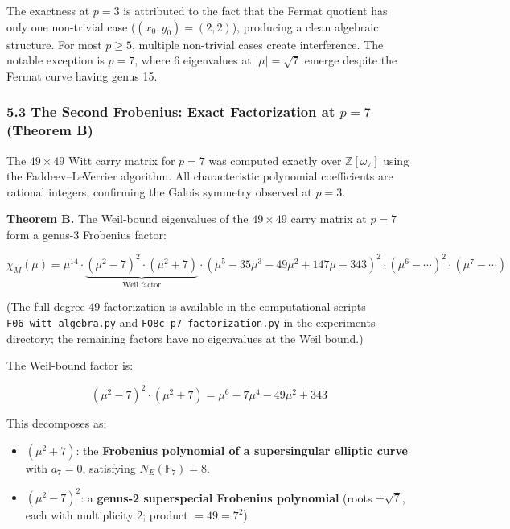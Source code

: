 \documentclass[
  11pt,
]{article}
\providecommand{\tightlist}{%
  \setlength{\itemsep}{0pt}\setlength{\parskip}{0pt}}
\begin{document}
The exactness at \(p = 3\) is attributed to the fact that the Fermat quotient
has only one non-trivial case (\((x_0, y_0) = (2,2)\)), producing a clean
algebraic structure. For most \(p \geq 5\), multiple non-trivial cases create
interference. The notable exception is \(p = 7\), where 6 eigenvalues at
\(\lvert\mu\rvert = \sqrt{7}\) emerge despite the Fermat curve having genus 15.

\subsubsection{\texorpdfstring{5.3 The Second Frobenius: Exact Factorization at
\(p = 7\) (Theorem
B)}{5.3 The Second Frobenius: Exact Factorization at p = 7 (Theorem B)}}\label{the-second-frobenius-exact-factorization-at-p-7-theorem-b}

The \(49 \times 49\) Witt carry matrix for \(p = 7\) was computed exactly over
\(\mathbb{Z}[\omega_7]\) using the Faddeev--LeVerrier algorithm. All
characteristic polynomial coefficients are rational integers, confirming the
Galois symmetry observed at \(p = 3\).

\textbf{Theorem B.} The Weil-bound eigenvalues of the \(49 \times 49\) carry
matrix at \(p = 7\) form a genus-3 Frobenius factor:

\[\chi_M(\mu) = \mu^{14} \cdot \underbrace{(\mu^2 - 7)^2 \cdot (\mu^2 + 7)}_{\text{Weil factor}} \cdot (\mu^5 - 35\mu^3 - 49\mu^2 + 147\mu - 343)^2 \cdot (\mu^6 - \cdots)^2 \cdot (\mu^7 - \cdots)\]

(The full degree-49 factorization is available in the computational scripts
\texttt{F06\_witt\_algebra.py} and \texttt{F08c\_p7\_factorization.py} in the
experiments directory; the remaining factors have no eigenvalues at the Weil
bound.)

The Weil-bound factor is:

\[(\mu^2 - 7)^2 \cdot (\mu^2 + 7) = \mu^6 - 7\mu^4 - 49\mu^2 + 343\]

This decomposes as:

\begin{itemize}
\tightlist
\item
  \((\mu^2 + 7)\): the \textbf{Frobenius polynomial of a supersingular elliptic
  curve} with \(a_7 = 0\), satisfying \(N_E(\mathbb{F}_7) = 8\).
\item
  \((\mu^2 - 7)^2\): a \textbf{genus-2 superspecial Frobenius polynomial} (roots
  \(\pm\sqrt{7}\), each with multiplicity 2; product \(= 49 = 7^2\)).
\end{itemize}
\end{document}
